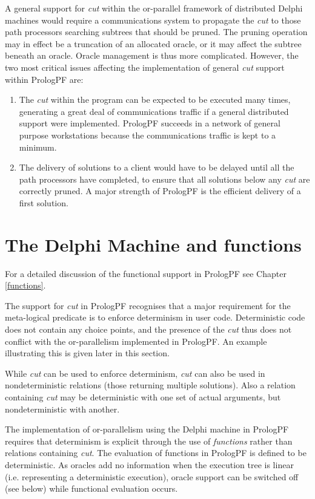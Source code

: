 A general support for \textit{cut} within the or-parallel framework of distributed
Delphi machines would require a communications system to propagate the \textit{cut} to
those path processors searching subtrees that should be pruned.
The pruning operation may in effect be a truncation
of an allocated oracle,
or it may affect the subtree beneath an oracle.  Oracle management is thus more complicated.
However, the two most critical issues affecting the implementation of general \textit{cut}
support within PrologPF are:
\begin{enumerate}
\item{The \textit{cut} within the program can be expected to be executed many times,
  generating a great deal of communications traffic if a general distributed support were
  implemented.  PrologPF succeeds in a network of general purpose workstations because
  the communications traffic is kept to a minimum.}
\item{The delivery of solutions to a client would have to be delayed until all the
  path processors have completed, to ensure that all solutions below any \textit{cut}
  are correctly pruned.  A major strength of PrologPF is the efficient delivery
  of a first solution.}
\end{enumerate}


\section{The Delphi Machine and functions} %

For a detailed discussion of the functional support in PrologPF see
Chapter \ref{functions}.

The support for \textit{cut} in PrologPF recognises that a major requirement for the
meta-logical predicate is to enforce determinism in user code.
Deterministic code does not contain any choice points, and the presence of the 
\textit{cut} thus does not conflict with the or-parallelism implemented in
PrologPF.  An example illustrating this is given later in this section.

While \textit{cut} can be used to enforce determinism, \textit{cut} can also be
used in nondeterministic relations (those returning multiple solutions).  Also
a relation containing \textit{cut} may be deterministic with one set of actual
arguments, but nondeterministic with another.

The implementation of or-parallelism using the Delphi machine in PrologPF requires that
determinism is explicit through the use of \textit{functions} rather than
relations containing \textit{cut}.  The evaluation of functions in PrologPF
is defined to be deterministic.  As oracles add no information when the execution tree
is linear
(i.e. representing a deterministic execution), oracle support can be switched off
(see below) while functional evaluation occurs.

